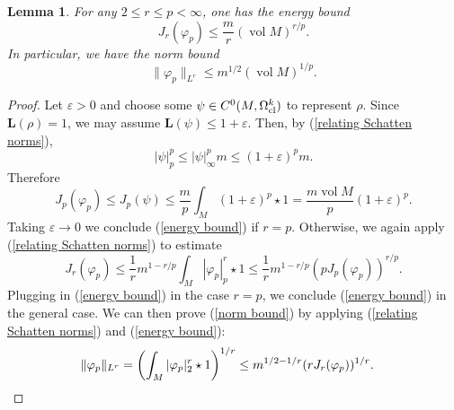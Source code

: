 \documentclass[reqno,11pt]{amsart}
\DeclareMathOperator{\vol}{vol}
\newcommand{\Comass}{\mathbf L}
\newtheorem{lemma}[theorem]{Lemma}
\theoremstyle{definition}
\numberwithin{equation}{section}
\begin{document}
\begin{lemma}
For any $2 \leq r \leq p < \infty$, one has the energy bound
\begin{equation}\label{energy bound}
J_r(\varphi_p) \leq \frac{m}{r} (\vol M)^{r/p}.
\end{equation}
In particular, we have the norm bound 
\begin{equation}\label{norm bound}
\|\varphi_p\|_{L^r} \leq m^{1/2} (\vol M)^{1/p}.
\end{equation}
\end{lemma}
\begin{proof}
Let $\varepsilon > 0$ and choose some $\psi \in C^0(M, \Omega^k_{\rm cl})$ to represent $\rho$.
Since $\Comass(\rho) = 1$, we may assume $\Comass(\psi) \leq 1 + \varepsilon$.
Then, by (\ref{relating Schatten norms}),
$$|\psi|_p^p \leq |\psi|_\infty^p m \leq (1 + \varepsilon)^p m.$$
Therefore 
$$J_p(\varphi_p) \leq J_p(\psi) \leq \frac{m}{p} \int_M (1 + \varepsilon)^p \star 1 = \frac{m \vol M}{p} (1 + \varepsilon)^p.$$
Taking $\varepsilon \to 0$ we conclude (\ref{energy bound}) if $r = p$.
Otherwise, we again apply (\ref{relating Schatten norms}) to estimate 
$$J_r(\varphi_p) \leq \frac{1}{r} m^{1 - r/p} \int_M |\varphi_p|_p^r \star 1 \leq \frac{1}{r} m^{1 - r/p} (pJ_p(\varphi_p))^{r/p}.$$
Plugging in (\ref{energy bound}) in the case $r = p$, we conclude (\ref{energy bound}) in the general case.
We can then prove (\ref{norm bound}) by applying (\ref{relating Schatten norms}) and (\ref{energy bound}):
\begin{align*}
\|\varphi_p\|_{L^r} &= \left(\int_M |\varphi_p|_2^r \star 1\right)^{1/r} \leq m^{1/2 - 1/r} (rJ_r(\varphi_p))^{1/r}. \qedhere 
\end{align*}
\end{proof}
\end{document}
